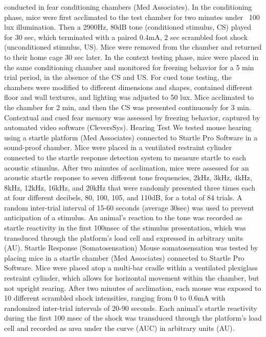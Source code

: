 conducted in fear conditioning chambers (Med Associates). In the conditioning
phase, mice were first acclimated to the test chamber for two minutes under ~100
lux illumination. Then a 2900Hz, 80dB tone (conditioned stimulus, CS) played for
30 sec, which terminated with a paired 0.4mA, 2 sec scrambled foot shock
(unconditioned stimulus, US). Mice were removed from the chamber and returned to
their home cage 30 sec later. In the context testing phase, mice were placed in
the same conditioning chamber and monitored for freezing behavior for a 5 min
trial period, in the absence of the CS and US. For cued tone testing, the
chambers were modified to different dimensions and shapes, contained different
floor and wall textures, and lighting was adjusted to 50 lux. Mice acclimated to
the chamber for 2 min, and then the CS was presented continuously for 3 min.
Contextual and cued fear memory was assessed by freezing behavior, captured by
automated video software (CleversSys). 
Hearing Test
We tested mouse hearing using a startle platform (Med Associates) connected to
Startle Pro Software in a sound-proof chamber. Mice were placed in a ventilated
restraint cylinder connected to the startle response detection system to measure
startle to each acoustic stimulus. After two minutes of acclimation, mice were
assessed for an acoustic startle response to seven different tone frequencies,
2kHz, 3kHz, 4kHz, 8kHz, 12kHz, 16kHz, and 20kHz that were randomly presented
three times each at four different decibels, 80, 100, 105, and 110dB, for a
total of 84 trials. A random inter-trial interval of 15-60 seconds (average
30sec) was used to prevent anticipation of a stimulus. An animal’s reaction to
the tone was recorded as startle reactivity in the first 100msec of the stimulus
presentation, which was transduced through the platform’s load cell and
expressed in arbitrary units (AU).  
Startle Response (Somatosensation)
Mouse somatosensation was tested by placing mice in a startle chamber (Med
Associates) connected to Startle Pro Software. Mice were placed atop a multi-bar
cradle within a ventilated plexiglass restraint cylinder, which allows for
horizontal movement within the chamber, but not upright rearing. After two
minutes of acclimation, each mouse was exposed to 10 different scrambled shock
intensities, ranging from 0 to 0.6mA with randomized inter-trial intervals of
20-90 seconds. Each animal’s startle reactivity during the first 100 msec of the
shock was transduced through the platform’s load cell and recorded as area under
the curve (AUC) in arbitrary units (AU). 

